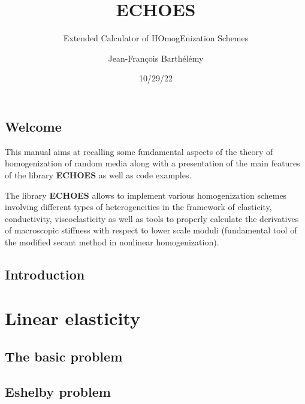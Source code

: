 \documentclass[
  letterpaper,
  DIV=11,
  numbers=noendperiod]{scrreprt}
\title{ECHOES}
\subtitle{Extended Calculator of HOmogEnization Schemes}
\author{Jean-François Barthélémy}
\date{10/29/22}
\renewcommand*\contentsname{Table of contents}
\newcommand\contentsname{Table of contents}
\begin{document}
\maketitle
\renewcommand*\contentsname{Table of contents}
{
\hypersetup{linkcolor=}
\setcounter{tocdepth}{2}
\tableofcontents
}

\hypertarget{sec-welcome}{%
\chapter*{Welcome}\label{sec-welcome}}


This manual aims at recalling some fundamental aspects of the theory of
homogenization of random media along with a presentation of the main
features of the library \textbf{ECHOES} as well as code examples.

The library \textbf{ECHOES} allows to implement various homogenization
schemes involving different types of heterogeneities in the framework of
elasticity, conductivity, viscoelasticity as well as tools to properly
calculate the derivatives of macroscopic stiffness with respect to lower
scale moduli (fundamental tool of the modified secant method in
nonlinear homogenization).


\hypertarget{sec-intro}{%
\chapter*{Introduction}\label{sec-intro}}


\part{Linear elasticity}

\hypertarget{sec-basics_elas}{%
\chapter{The basic problem}\label{sec-basics_elas}}

\hypertarget{sec-eshelby_elas}{%
\chapter{Eshelby problem}\label{sec-eshelby_elas}}
\end{document}
